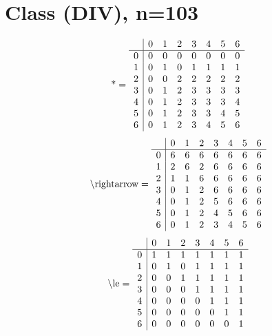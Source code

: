 \documentclass[11pt]{article}
\begin{document}
\section{Class (DIV), n=103}
\[\text{*} = 
\begin{array}{r | r r r r r r r}
 & 0 & 1 & 2 & 3 & 4 & 5 & 6 \\ \hline
0 & 0 & 0 & 0 & 0 & 0 & 0 & 0 \\
1 & 0 & 1 & 0 & 1 & 1 & 1 & 1 \\
2 & 0 & 0 & 2 & 2 & 2 & 2 & 2 \\
3 & 0 & 1 & 2 & 3 & 3 & 3 & 3 \\
4 & 0 & 1 & 2 & 3 & 3 & 3 & 4 \\
5 & 0 & 1 & 2 & 3 & 3 & 4 & 5 \\
6 & 0 & 1 & 2 & 3 & 4 & 5 & 6 \\
\end{array}
\]
\[\text{\textbackslash rightarrow} = 
\begin{array}{r | r r r r r r r}
 & 0 & 1 & 2 & 3 & 4 & 5 & 6 \\ \hline
0 & 6 & 6 & 6 & 6 & 6 & 6 & 6 \\
1 & 2 & 6 & 2 & 6 & 6 & 6 & 6 \\
2 & 1 & 1 & 6 & 6 & 6 & 6 & 6 \\
3 & 0 & 1 & 2 & 6 & 6 & 6 & 6 \\
4 & 0 & 1 & 2 & 5 & 6 & 6 & 6 \\
5 & 0 & 1 & 2 & 4 & 5 & 6 & 6 \\
6 & 0 & 1 & 2 & 3 & 4 & 5 & 6 \\
\end{array}
\]
\[\text{\textbackslash le} = 
\begin{array}{r | r r r r r r r}
 & 0 & 1 & 2 & 3 & 4 & 5 & 6 \\ \hline
0 & 1 & 1 & 1 & 1 & 1 & 1 & 1 \\
1 & 0 & 1 & 0 & 1 & 1 & 1 & 1 \\
2 & 0 & 0 & 1 & 1 & 1 & 1 & 1 \\
3 & 0 & 0 & 0 & 1 & 1 & 1 & 1 \\
4 & 0 & 0 & 0 & 0 & 1 & 1 & 1 \\
5 & 0 & 0 & 0 & 0 & 0 & 1 & 1 \\
6 & 0 & 0 & 0 & 0 & 0 & 0 & 1 \\
\end{array}
\]
\end{document}
